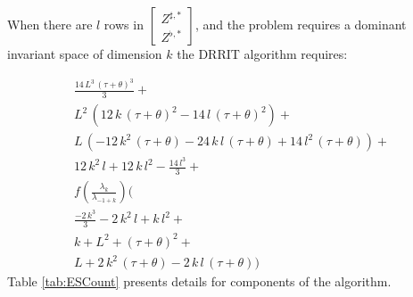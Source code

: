 

When there are $l$ rows in $
\begin{bmatrix}
Z^{\sharp,\ast}\\Z^{\flat,\ast}
\end{bmatrix}$, and the problem requires a dominant invariant space of dimension
$k$ 
the DRRIT algorithm requires:

\begin{multline*}%
{\frac{14\,{L^3}\,{{\left( \tau + \theta \right) }^3}}{3}}+\\
{L^2}\,\left( 12\,k\,{{\left( \tau + \theta \right) }^2} - 
    14\,l\,{{\left( \tau + \theta \right) }^2} \right) +\\
L\,\left( -12\,{k^2}\,\left( \tau + \theta \right)  - 
    24\,k\,l\,\left( \tau + \theta \right)  + 
    14\,{l^2}\,\left( \tau + \theta \right)  \right) +\\
12\,{k^2}\,l + 12\,k\,{l^2} - {\frac{14\,{l^3}}{3}} +\\
f({\frac{{{\lambda}_k}}{{{\lambda}_{-1 + k}}}})  ( \\
{\frac{-2\,{k^3}}{3}} - 2\,{k^2}\,l + k\,{l^2}+\\
k + {L^2} + {{\left( \tau + \theta \right) }^2} +\\
L + 2\,{k^2}\,\left( \tau + \theta \right)  - 
  2\,k\,l\,\left( \tau + \theta \right)   )
\end{multline*}
Table \ref{tab:ESCount} presents details for components of the algorithm.

